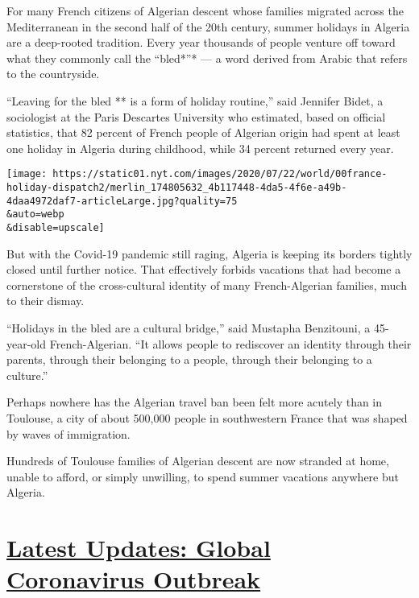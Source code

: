 For many French citizens of Algerian descent whose families migrated
across the Mediterranean in the second half of the 20th century, summer
holidays in Algeria are a deep-rooted tradition. Every year thousands of
people venture off toward what they commonly call the ``bled*''* --- a
word derived from Arabic that refers to the countryside.

``Leaving for the bled ** is a form of holiday routine,'' said Jennifer
Bidet, a sociologist at the Paris Descartes University who estimated,
based on official statistics, that 82 percent of French people of
Algerian origin had spent at least one holiday in Algeria during
childhood, while 34 percent returned every year.

\texttt{[image: https://static01.nyt.com/images/2020/07/22/world/00france-holiday-dispatch2/merlin\_174805632\_4b117448-4da5-4f6e-a49b-4daa4972daf7-articleLarge.jpg?quality=75\\\&auto=webp\\\&disable=upscale]}

But with the Covid-19 pandemic still raging, Algeria is keeping its
borders tightly closed until further notice. That effectively forbids
vacations that had become a cornerstone of the cross-cultural identity
of many French-Algerian families, much to their dismay.

``Holidays in the bled are a cultural bridge,'' said Mustapha
Benzitouni, a 45-year-old French-Algerian. ``It allows people to
rediscover an identity through their parents, through their belonging to
a people, through their belonging to a culture.''

Perhaps nowhere has the Algerian travel ban been felt more acutely than
in Toulouse, a city of about 500,000 people in southwestern France that
was shaped by waves of immigration.

Hundreds of Toulouse families of Algerian descent are now stranded at
home, unable to afford, or simply unwilling, to spend summer vacations
anywhere but Algeria.

\hypertarget{latest-updates-global-coronavirus-outbreak}{%
\section{\texorpdfstring{\href{https://www.nytimes.com/2020/08/01/world/coronavirus-covid-19.html?action=click\&pgtype=Article\&state=default\&region=MAIN_CONTENT_1\&context=storylines_live_updates}{Latest
Updates: Global Coronavirus
Outbreak}}{Latest Updates: Global Coronavirus Outbreak}}\label{latest-updates-global-coronavirus-outbreak}}

